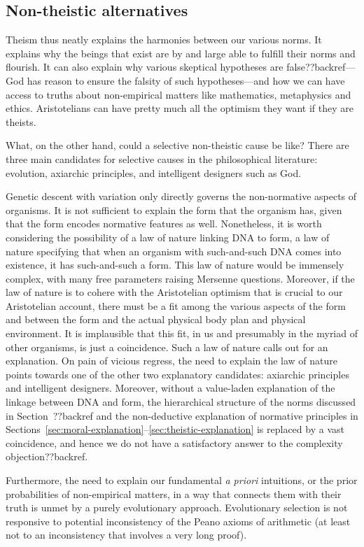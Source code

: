 \subsection{Non-theistic alternatives}
Theism thus neatly explains the harmonies between our various norms. It explains why the beings that exist are
by and large able to fulfill their norms and flourish. It can also explain why various skeptical hypotheses are
false??backref---God has reason to ensure the falsity of such hypotheses---and how we can have access to truths about
non-empirical matters like mathematics, metaphysics and ethics. Aristotelians can have pretty much all the optimism
they want if they are theists.

What, on the other hand, could a selective non-theistic cause be like? There are three main candidates for selective causes in the philosophical literature: evolution, axiarchic principles, and intelligent designers such as God.  

Genetic descent with variation only directly governs the non-normative aspects of organisms. It is not sufficient to explain
the form that the organism has, given that the form encodes normative features as well. Nonetheless, it is worth considering
the possibility of a law of nature linking DNA to form, a law of nature specifying that when an organism with such-and-such 
DNA comes into existence, it has such-and-such a form. This law of nature would be immensely complex, with many free parameters
raising Mersenne questions. Moreover, if the law of nature is to cohere with the Aristotelian optimism that is crucial to our
Aristotelian account, there must be a fit among the various aspects of the form and between the form and the actual physical 
body plan and physical environment. It is implausible that this fit, in us and presumably in the myriad of other organisms,
is just a coincidence. Such a law of nature calls out for an explanation. On pain of vicious regress, the need to explain the 
law of nature points towards one of the other two explanatory candidates: axiarchic principles and intelligent designers.
Moreover, without a value-laden explanation of the linkage between DNA and form, the hierarchical structure of the
norms discussed in Section~??backref and the non-deductive explanation of normative principles in Sections~\ref{sec:moral-explanation}--\ref{sec:theistic-explanation} is replaced by a vast coincidence, and hence we do not have a 
satisfactory answer to the complexity objection??backref.

Furthermore, the need to explain our fundamental \textit{a priori} intuitions, or the prior probabilities
of non-empirical matters, in a way that connects them with their truth
is unmet by a purely evolutionary approach. Evolutionary selection is not responsive to potential inconsistency of the Peano axioms of arithmetic (at least not to an inconsistency that involves a very long proof).

